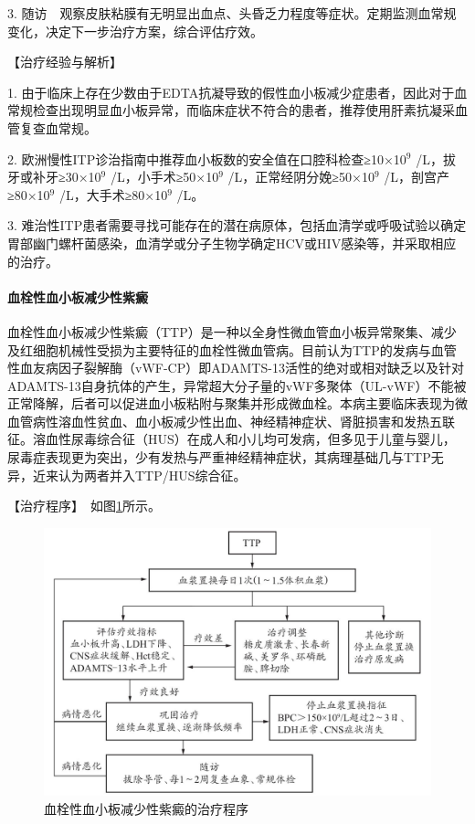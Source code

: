 3.
随访　观察皮肤粘膜有无明显出血点、头昏乏力程度等症状。定期监测血常规变化，决定下一步治疗方案，综合评估疗效。

【治疗经验与解析】

1.
由于临床上存在少数由于EDTA抗凝导致的假性血小板减少症患者，因此对于血常规检查出现明显血小板异常，而临床症状不符合的患者，推荐使用肝素抗凝采血管复查血常规。

2. 欧洲慢性ITP诊治指南中推荐血小板数的安全值在口腔科检查≥10×10$^{9}$
/L，拔牙或补牙≥30×10$^{9}$ /L，小手术≥50×10$^{9}$ /L，正常经阴分娩≥50×10$^{9}$
/L，剖宫产≥80×10$^{9}$ /L，大手术≥80×10$^{9}$ /L。

3.
难治性ITP患者需要寻找可能存在的潜在病原体，包括血清学或呼吸试验以确定胃部幽门螺杆菌感染，血清学或分子生物学确定HCV或HIV感染等，并采取相应的治疗。

\paragraph{血栓性血小板减少性紫癜}

血栓性血小板减少性紫癜（TTP）是一种以全身性微血管血小板异常聚集、减少及红细胞机械性受损为主要特征的血栓性微血管病。目前认为TTP的发病与血管性血友病因子裂解酶（vWF-CP）即ADAMTS-13活性的绝对或相对缺乏以及针对ADAMTS-13自身抗体的产生，异常超大分子量的vWF多聚体（UL-vWF）不能被正常降解，后者可以促进血小板粘附与聚集并形成微血栓。本病主要临床表现为微血管病性溶血性贫血、血小板减少性出血、神经精神症状、肾脏损害和发热五联征。溶血性尿毒综合征（HUS）在成人和小儿均可发病，但多见于儿童与婴儿，尿毒症表现更为突出，少有发热与严重神经精神症状，其病理基础几与TTP无异，近来认为两者并入TTP/HUS综合征。

【治疗程序】　如图\ref{fig5-5-2}所示。

\begin{figure}[!htbp]
 \centering
 \includegraphics{./images/Image00170.jpg}
 \captionsetup{justification=centering}
 \caption{血栓性血小板减少性紫癜的治疗程序}
 \label{fig5-5-2}
  \end{figure} 

